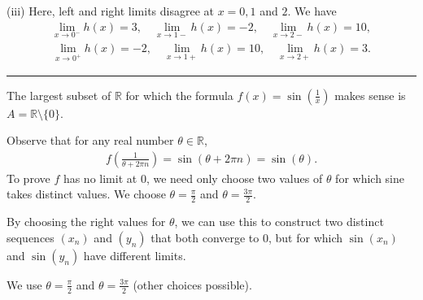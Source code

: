 \documentclass[letterpaper,10pt,english]{jupyterBook}
\begin{document}
\sphinxAtStartPar
(iii) Here, left and right limits disagree at \(x = 0, 1\) and \(2\). We have
\begin{equation*}
\begin{split}
\lim_{x \rightarrow 0^-}h(x) = 3, \hspace{1em} \lim_{x \rightarrow 1-}h(x) = -2, \hspace{1em}  \lim_{x \rightarrow 2-}h(x) = 10,
\end{split}
\end{equation*}\begin{equation*}
\begin{split}
\lim_{x \rightarrow 0^+}h(x) = -2, \hspace{1em} \lim_{x \rightarrow 1+}h(x) = 10, \hspace{1em}  \lim_{x \rightarrow 2+}h(x) = 3.
\end{split}
\end{equation*}

\bigskip\hrule\bigskip


\sphinxAtStartPar
{\hyperref[\detokenize{Problems:id9}]{}}  The largest subset of \(\mathbb{R}\) for which the formula \(f(x)=\sin\left(\frac{1}{x}\right)\) makes sense is \(A = \mathbb{R} \setminus \{0\}\).

Observe that for any real number \(\theta\in\mathbb{R}\),
\begin{equation*}
\begin{split}
f\left(\frac{1}{\theta+2\pi n}\right) = \sin(\theta+2\pi n) = \sin(\theta).
\end{split}
\end{equation*}
\sphinxAtStartPar
To prove \(f\) has no limit at \(0\), we need only choose two values of \(\theta\) for which sine takes distinct values. We choose \(\theta=\frac{\pi}{2}\) and \(\theta=\frac{3\pi}{2}\).

By choosing the right values for \(\theta\), we can use this to construct two distinct sequences \((x_n)\) and \((y_n)\) that both converge to \(0\), but for which \(\sin(x_n)\) and \(\sin(y_n)\) have different limits.

We use \(\theta=\frac{\pi}{2}\) and \(\theta=\frac{3\pi}{2}\) (other choices possible).
\end{document}
